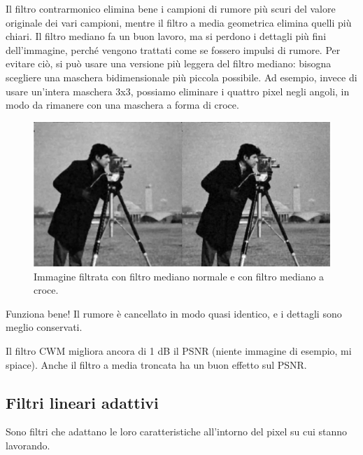 \documentclass[a4paper,11pt]{article}
\begin{document}
Il filtro contrarmonico elimina bene i campioni di rumore più scuri del valore originale dei vari campioni, mentre il filtro a media geometrica elimina
quelli più chiari. Il filtro mediano fa un buon lavoro, ma si perdono i dettagli più fini dell'immagine, perché vengono trattati come se fossero impulsi di rumore.
Per evitare ciò, si può usare una versione più leggera del filtro mediano: bisogna scegliere una maschera bidimensionale più piccola possibile. Ad esempio,
invece di usare un'intera maschera 3x3, possiamo eliminare i quattro pixel negli angoli, in modo da rimanere con una maschera a forma di croce.

\renewcommand{\thefigure}{8.3}
\begin{figure}[!h]
  \centering
    \includegraphics[scale=0.3]{images/8/cameraman_median_vs_cross.png}
    \caption{Immagine filtrata con filtro mediano normale e con filtro mediano a croce.}
\end{figure}

Funziona bene! Il rumore è cancellato in modo quasi identico, e i dettagli sono meglio conservati.
\par
Il filtro CWM migliora ancora di 1 dB il PSNR (niente immagine di esempio, mi spiace). Anche il filtro a media troncata ha un buon effetto sul PSNR.

\subsection{Filtri lineari adattivi}
Sono filtri che adattano le loro caratteristiche all'intorno del pixel su cui stanno lavorando.
\end{document}
